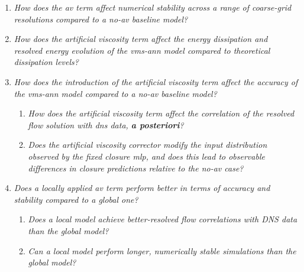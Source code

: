\begin{enumerate}[label=\textbf{\color{titlecolor}RQ\arabic*.}]


    \item \textit{How does the \gls{av} term affect numerical stability across a range of coarse-grid resolutions compared to a no-\gls{av} baseline model?}

    \item \textit{How does the artificial viscosity term affect the energy dissipation and resolved energy evolution of the \gls{vms}-\gls{ann} model compared to theoretical dissipation levels?}

    \item \textit{How does the introduction of the artificial viscosity term affect the accuracy of the \gls{vms}-\gls{ann} model compared to a no-\gls{av} baseline model?}
        \begin{enumerate}[label=\textbf{\color{titlecolor}SQ\arabic{enumi}.\alph*}]
        \item \textit{How does the artificial viscosity term affect the correlation of the resolved flow solution with \gls{dns} data, \textbf{a posteriori}?} 
        \item \textit{Does the artificial viscosity corrector modify the input distribution observed by the fixed closure \gls{mlp}, and does this lead to observable differences in closure predictions relative to the no-\gls{av} case?}
    \end{enumerate}

    \item \textit{Does a locally applied \gls{av} term perform better in terms of accuracy and stability compared to a global one?}
        \begin{enumerate}[label=\textbf{\color{titlecolor}SQ\arabic{enumi}.\alph*}]
            \item \textit{Does a local model achieve better-resolved flow correlations with DNS data than the global model?}
            \item \textit{Can a local model perform longer, numerically stable simulations than the global model?}
        \end{enumerate}
\end{enumerate}

